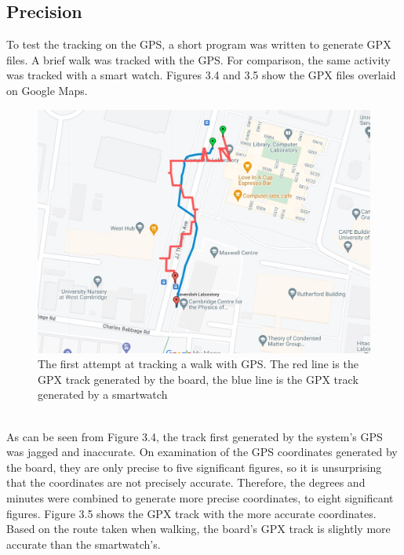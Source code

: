 \documentclass[12pt,a4paper]{report}
\begin{document}
\subsection{Precision}
To test the tracking on the GPS, a short program was written to generate GPX files. A brief walk was tracked with the GPS. For comparison, the same activity was tracked with a smart watch. Figures 3.4 and 3.5 show the GPX files overlaid on Google Maps. \\
\begin{figure}[h]
\begin{center}
\includegraphics[scale=0.4]{gps1.jpg}
\end{center}
\caption{The first attempt at tracking a walk with GPS. The red line is the GPX track generated by the board, the blue line is the GPX track generated by a smartwatch \cite{googlemapsgeneral}}
\end{figure}\\ 
As can be seen from Figure 3.4, the track first generated by the system's GPS was jagged and inaccurate. On examination of the GPS coordinates generated by the board, they are only precise to five significant figures, so it is unsurprising that the coordinates are not precisely accurate. Therefore, the degrees and minutes were combined to generate more precise coordinates, to eight significant figures. Figure 3.5 shows the GPX track with the more accurate coordinates. Based on the route taken when walking, the board's GPX track is slightly more accurate than the smartwatch's. 
\end{document}
